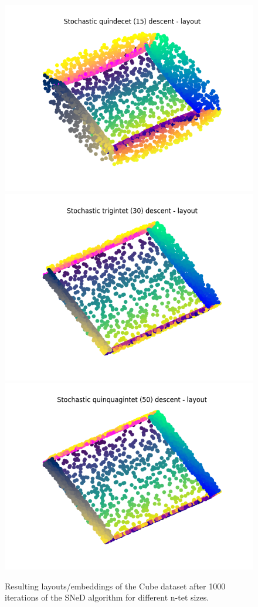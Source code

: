 \documentclass{l4proj}
\begin{document}
\begin{appendices}
\begin{figure}[ht]
    \includegraphics[width=0.4\linewidth]{images/n-tet layouts/cube/Stochastic quindecet (15) descent - layout.png}\\
    \includegraphics[width=0.4\linewidth]{images/n-tet layouts/cube/Stochastic trigintet (30) descent - layout.png} 
    \includegraphics[width=0.4\linewidth]{images/n-tet layouts/cube/Stochastic quinquagintet (50) descent - layout.png} \\


    \caption{Resulting layouts/embeddings of the Cube dataset after 1000 iterations of the SNeD algorithm for different n-tet sizes.
    }

    \label{fig:init_demo} 
\end{figure}



\end{appendices}
\end{document}
